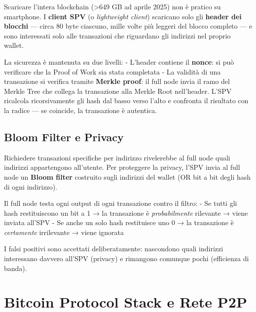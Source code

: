 \documentclass[
  italian,
  openany]{book}
\begin{document}
Scaricare l'intera blockchain (\textgreater649 GB ad aprile 2025) non è
pratico su smartphone. I \textbf{client SPV} (o \emph{lightweight
client}) scaricano solo gli \textbf{header dei blocchi} --- circa 80
byte ciascuno, mille volte più leggeri del blocco completo --- e sono
interessati solo alle transazioni che riguardano gli indirizzi nel
proprio wallet.

La sicurezza è mantenuta su due livelli: - L'header contiene il
\textbf{nonce}: si può verificare che la Proof of Work sia stata
completata - La validità di una transazione si verifica tramite
\textbf{Merkle proof}: il full node invia il ramo del Merkle Tree che
collega la transazione alla Merkle Root nell'header. L'SPV ricalcola
ricorsivamente gli hash dal basso verso l'alto e confronta il risultato
con la radice --- se coincide, la transazione è autentica.

\subsection{Bloom Filter e Privacy}\label{bloom-filter-e-privacy}

Richiedere transazioni specifiche per indirizzo rivelerebbe al full node
quali indirizzi appartengono all'utente. Per proteggere la privacy,
l'SPV invia al full node un \textbf{Bloom filter} costruito sugli
indirizzi del wallet (OR bit a bit degli hash di ogni indirizzo).

Il full node testa ogni output di ogni transazione contro il filtro: -
Se tutti gli hash restituiscono un bit a 1 → la transazione è
\emph{probabilmente} rilevante → viene inviata all'SPV - Se anche un
solo hash restituisce uno 0 → la transazione è \emph{certamente}
irrilevante → viene ignorata

I falsi positivi sono accettati deliberatamente: nascondono quali
indirizzi interessano davvero all'SPV (privacy) e rimangono comunque
pochi (efficienza di banda).

\section{Bitcoin Protocol Stack e Rete
P2P}\label{bitcoin-protocol-stack-e-rete-p2p}
\end{document}
